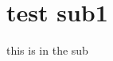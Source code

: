 \documentclass[tom-ari]{subfile}
\begin{document}
	\chapter{test sub1}
	this is in the sub
\end{document}

